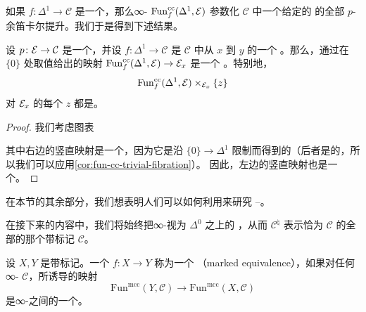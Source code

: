 如果 $f\colon \Delta^1 \to \mathcal{C}$ 是一个\trMorphism{}，那么∞-\trCategory{}%
$\mathrm{Fun}^{\mathrm{cc}}_f(\Delta^1, \mathcal{E})$ 参数化 $\mathcal{C}$ 中一个给定的%
\trMorphism{}的全部 $p$-余笛卡尔提升。我们于是得到下述结果。

\begin{corollary}\label{cor:cocartesian-lifts-contractible}
设 $p\colon \mathcal{E} \to \mathcal{C}$ 是一个\trCocartesianFibration{}，并设
$f\colon \Delta^1 \to \mathcal{C}$ 是 $\mathcal{C}$ 中从 $x$ 到 $y$ 的一个%
\trMorphism{}。那么，通过在 $\{0\}$ 处取值给出的映射
$\mathrm{Fun}^{\mathrm{cc}}_f(\Delta^1, \mathcal{E}) \to \mathcal{E}_x$ 是一个%
\trTrivialFibration{}。特别地，\trSimplicialSet{}%
\[
\mathrm{Fun}^{\mathrm{cc}}_f(\Delta^1, \mathcal{E}) \times_{\mathcal{E}_x} \{z\}
\]
对 $\mathcal{E}_x$ 的每个\trObject{} $z$ 都是\trContractible{}\trKanComplex{}。
\end{corollary}

\begin{proof}
我们考虑\trPullback{}图表
\begin{center}
\end{center}
其中右边的竖直映射是一个\trTrivialFibration{}，因为它是沿 $\{0\} \to \Delta^1$
限制而得到的（后者是\trLeftAnodyne{}的，所以我们可以应用\cref{cor:fun-cc-trivial-fibration}）。
因此，左边的竖直映射也是一个\trTrivialFibration{}。
\end{proof}

在本节的其余部分，我们想表明人们可以如何利用\trMarkedSimplicialSet{}来研究%
\trDwyer{}--\trKan{}\trLocalization{}。

在接下来的内容中，我们将始终把∞-\trCategories{}视为 $\Delta^0$ 之上的%
\trCocartesianFibration{}，从而 $\mathcal{C}^\natural$ 表示\trMarkedEdge{}恰为 $\mathcal{C}$
的全部\trEquivalence{}的那个带标记\trSimplicialSet{} $\mathcal{C}$。

\begin{definition}\label{def:marked-equivalence}
设 $X, Y$ 是带标记\trSimplicialSet{}。一个\trMorphism{} $f\colon X \to Y$ 称为一个
\emph{\trMarkedEquivalence{}}（marked equivalence），如果对任何∞-\trCategory{}%
$\mathcal{C}$，所诱导的映射
\[
\mathrm{Fun}^{\mathrm{mcc}}(Y, \mathcal{C})
\longrightarrow
\mathrm{Fun}^{\mathrm{mcc}}(X, \mathcal{C})
\]
是∞-\trCategories{}之间的一个\trEquivalence{}。
\end{definition}

